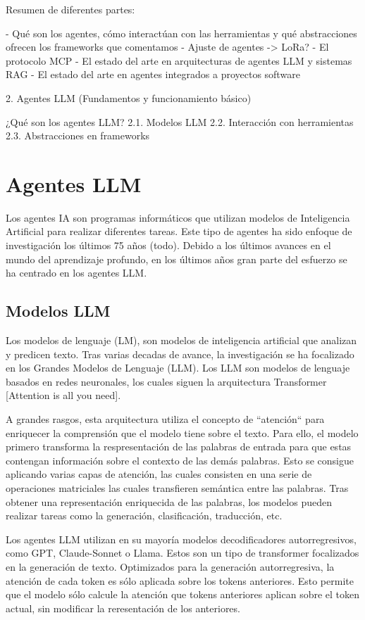 Resumen de diferentes partes: 

- Qué son los agentes, cómo interactúan con las herramientas y qué abstracciones ofrecen los frameworks que comentamos
- Ajuste de agentes -> LoRa?
- El protocolo MCP
- El estado del arte en arquitecturas de agentes LLM y sistemas RAG
- El estado del arte en agentes integrados a proyectos software

2. Agentes LLM (Fundamentos y funcionamiento básico)

¿Qué son los agentes LLM?
2.1. Modelos LLM
2.2. Interacción con herramientas
2.3. Abstracciones en frameworks

\section{Agentes LLM}

Los agentes IA son programas informáticos que utilizan modelos de Inteligencia Artificial para realizar diferentes tareas. Este tipo de agentes ha sido enfoque de investigación los últimos 75 años (todo). Debido a los últimos avances en el mundo del aprendizaje profundo, en los últimos años gran parte del esfuerzo se ha centrado en los agentes LLM.

\subsection{Modelos LLM}

Los modelos de lenguaje (LM), son modelos de inteligencia artificial que analizan y predicen texto. Tras varias decadas de avance, la investigación se ha focalizado en los Grandes Modelos de Lenguaje (LLM). Los LLM son modelos de lenguaje basados en redes neuronales, los cuales siguen la arquitectura Transformer [Attention is all you need]. 

A grandes rasgos, esta arquitectura utiliza el concepto de ``atención`` para enriquecer la comprensión que el modelo tiene sobre el texto. Para ello, el modelo primero transforma la respresentación de las palabras de entrada para que estas contengan información sobre el contexto de las demás palabras. Esto se consigue aplicando varias capas de atención, las cuales consisten en una serie de operaciones matriciales las cuales transfieren semántica entre las palabras. Tras obtener una representación enriquecida de las palabras, los modelos pueden realizar tareas como la generación, clasificación, traducción, etc.

Los agentes LLM utilizan en su mayoría modelos decodificadores autorregresivos, como GPT, Claude-Sonnet o Llama. Estos son un tipo de transformer focalizados en la generación de texto. Optimizados para la generación autorregresiva, la atención de cada token es sólo aplicada sobre los tokens anteriores. Esto permite que el modelo sólo calcule la atención que tokens anteriores aplican sobre el token actual, sin modificar la reresentación de los anteriores. 

